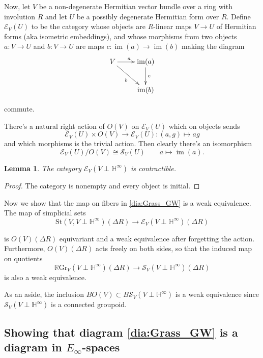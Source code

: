 \documentclass[edeposit,fullpage]{uiucthesis2009}
\newcommand{\mbb}{\mathbb}
\newcommand{\mc}{\mathcal}
\newcommand{\RGr}{\mathbb R\mathrm{Gr}}
\newcommand{\St}{\mathrm{St}}
\DeclareMathOperator*{\im}{im}
\theoremstyle{plain}
\newtheorem{lemma}{Lemma}
\numberwithin{lemma}{section}
\theoremstyle{definition}
\begin{document}
Now, let $V$ be a non-degenerate Hermitian vector bundle over a ring with
involution $R$ and let $U$ be a possibly degenerate Hermitian form
over $R$. Define $\mc E_V(U)$ to be the category whose objects are
$R$-linear maps $V \rightarrow U$ of Hermitian forms (aka isometric embeddings), and whose
morphisms from two objects $a : V \rightarrow U$ and $b : V
\rightarrow U$ are maps $c : \im(a) \rightarrow \im(b)$ making the
diagram
\[
\xymatrix{V \ar[r]^a\ar[dr]_b & \im(a) \ar[d]^c\\ & \im(b)}
\]

commute.

There's a natural right action of $O(V)$ on $\mc E_V(U)$ which on
objects sends
\[
\mc E_V(U) \times O(V) \rightarrow \mc E_V(U) : (a,g) \mapsto ag
\]
and which morphisms is the trivial action.
Then clearly there's an isomorphism
\[
\mc E_V(U)/O(V) \cong \mc S_V(U) \qquad a \mapsto \im(a).
\] 

\begin{lemma}
The category $\mc E_V(V \perp \mbb H^\infty)$ is contractible.
\end{lemma}

\begin{proof}
The category is nonempty and every object is initial.
\end{proof}

Now we show that the map on fibers in \ref{dia:Grass_GW} is a weak
equivalence. The map of simplicial sets
\[
\St(V,V\perp \mbb H^\infty)(\Delta R) \rightarrow \mc E_V(V \perp \mbb
H^\infty)(\Delta R)
\]

is $O(V)(\Delta R)$ equivariant and a weak equivalence after
forgetting the action. Furthermore, $O(V)(\Delta R)$ acts freely on
both sides, so that the induced map on quotients 
\begin{equation}\label{eq:RGr_Sv}
\RGr_V(V \perp \mbb
H^\infty)({\Delta R}) \rightarrow \mc S_V(V \perp \mbb
H^\infty)(\Delta R)
\end{equation}
 is also a weak equivalence. 

As an aside, the inclusion $BO(V) \subset B\mc S_V(V \perp \mbb
H^\infty)$ is a weak equivalence since $\mc S_V(V \perp \mbb
H^\infty)$ is a connected groupoid. 

\subsection{Showing that diagram \ref{dia:Grass_GW} is a diagram in
  $E_\infty$-spaces}
\end{document}

